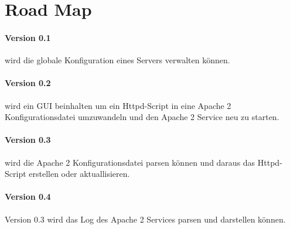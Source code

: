 \section{Road Map}

\paragraph{Version 0.1}

wird die globale Konfiguration eines Servers verwalten können.

\paragraph{Version 0.2}

wird ein GUI beinhalten um ein Httpd-Script in eine
Apache 2 Konfigurationsdatei umzuwandeln und den Apache 2 Service neu zu
starten.

\paragraph{Version 0.3}

wird die Apache 2 Konfigurationsdatei parsen können und daraus
das Httpd-Script erstellen oder aktuallisieren.

\paragraph{Version 0.4}

Version 0.3 wird das Log des Apache 2 Services parsen und darstellen können.

